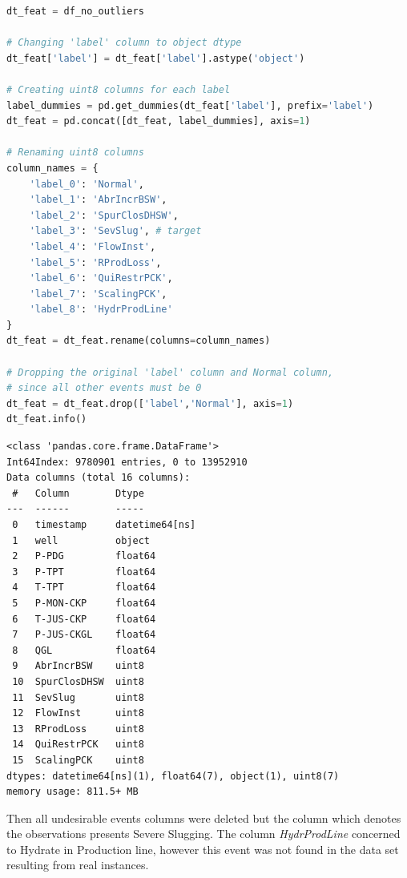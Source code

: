 \documentclass{article}
\begin{document}
\begin{lstlisting}[language=Python]
dt_feat = df_no_outliers

# Changing 'label' column to object dtype
dt_feat['label'] = dt_feat['label'].astype('object') 

# Creating uint8 columns for each label
label_dummies = pd.get_dummies(dt_feat['label'], prefix='label')
dt_feat = pd.concat([dt_feat, label_dummies], axis=1)

# Renaming uint8 columns
column_names = {
    'label_0': 'Normal',
    'label_1': 'AbrIncrBSW',
    'label_2': 'SpurClosDHSW',
    'label_3': 'SevSlug', # target
    'label_4': 'FlowInst',
    'label_5': 'RProdLoss',
    'label_6': 'QuiRestrPCK',
    'label_7': 'ScalingPCK',
    'label_8': 'HydrProdLine'
}
dt_feat = dt_feat.rename(columns=column_names)

# Dropping the original 'label' column and Normal column, 
# since all other events must be 0
dt_feat = dt_feat.drop(['label','Normal'], axis=1)
dt_feat.info()
\end{lstlisting}
\begin{verbatim}
<class 'pandas.core.frame.DataFrame'>
Int64Index: 9780901 entries, 0 to 13952910
Data columns (total 16 columns):
 #   Column        Dtype         
---  ------        -----         
 0   timestamp     datetime64[ns]
 1   well          object        
 2   P-PDG         float64       
 3   P-TPT         float64       
 4   T-TPT         float64       
 5   P-MON-CKP     float64       
 6   T-JUS-CKP     float64       
 7   P-JUS-CKGL    float64       
 8   QGL           float64       
 9   AbrIncrBSW    uint8         
 10  SpurClosDHSW  uint8         
 11  SevSlug       uint8         
 12  FlowInst      uint8         
 13  RProdLoss     uint8         
 14  QuiRestrPCK   uint8         
 15  ScalingPCK    uint8         
dtypes: datetime64[ns](1), float64(7), object(1), uint8(7)
memory usage: 811.5+ MB
\end{verbatim}

Then all undesirable events columns were deleted but the column which denotes the observations presents Severe Slugging. The column \emph{HydrProdLine} concerned to Hydrate in Production line, however this event was not found in the data set resulting from real instances.
\end{document}

